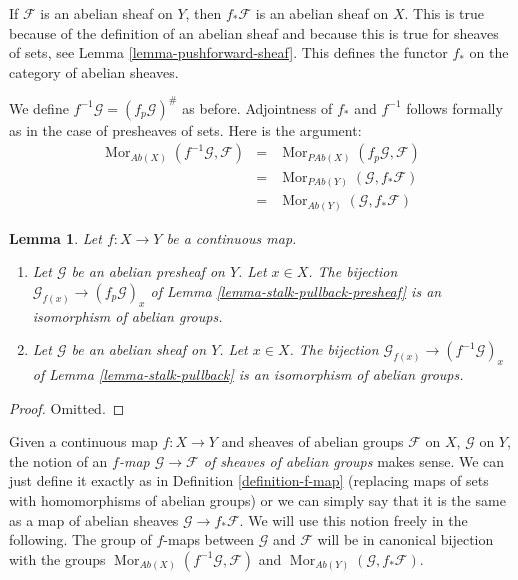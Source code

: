 \documentclass{stacks-project}
\theoremstyle{plain}
\newtheorem{lemma}[subsection]{Lemma}
\theoremstyle{definition}
\theoremstyle{remark}
\numberwithin{equation}{subsection}
\def\Mor{\mathop{\mathrm{Mor}}\nolimits}
\begin{document}
\medskip\noindent
If $\mathcal{F}$ is an abelian sheaf on $Y$, then $f_*\mathcal{F}$
is an abelian sheaf on $X$. This is true because of the definition
of an abelian sheaf and because this is true for sheaves of sets,
see Lemma \ref{lemma-pushforward-sheaf}. This defines the functor
$f_*$ on the category of abelian sheaves.

\medskip\noindent
We define $f^{-1}\mathcal{G} = (f_p\mathcal{G})^\#$ as before.
Adjointness of $f_*$ and $f^{-1}$ follows formally as in
the case of presheaves of sets. Here is the argument:
\begin{eqnarray*}
\Mor_{\textit{Ab}(X)}(f^{-1}\mathcal{G}, \mathcal{F})
& = &
\Mor_{\textit{PAb}(X)}(f_p\mathcal{G}, \mathcal{F}) \\
& = &
\Mor_{\textit{PAb}(Y)}(\mathcal{G}, f_*\mathcal{F}) \\
& = &
\Mor_{\textit{Ab}(Y)}(\mathcal{G}, f_*\mathcal{F})
\end{eqnarray*}

\begin{lemma}
\label{lemma-pullback-abelian-stalk}
Let $f : X \to Y$ be a continuous map.
\begin{enumerate}
\item Let $\mathcal{G}$ be an abelian presheaf on $Y$.
Let $x \in X$. The bijection
$\mathcal{G}_{f(x)} \to (f_p\mathcal{G})_x$ of
Lemma \ref{lemma-stalk-pullback-presheaf} is an isomorphism of abelian groups.
\item Let $\mathcal{G}$ be an abelian sheaf on $Y$.
Let $x \in X$. The bijection
$\mathcal{G}_{f(x)} \to (f^{-1}\mathcal{G})_x$ of
Lemma \ref{lemma-stalk-pullback} is an isomorphism of abelian groups.
\end{enumerate}
\end{lemma}

\begin{proof}
Omitted.
\end{proof}

\noindent
Given a continuous map $f : X \to Y$ and sheaves of abelian
groups $\mathcal{F}$ on $X$, $\mathcal{G}$ on $Y$, the notion
of an {\it $f$-map $\mathcal{G} \to \mathcal{F}$
of sheaves of abelian groups} makes sense. We can just define
it exactly as in Definition \ref{definition-f-map} (replacing maps
of sets with homomorphisms of abelian groups) or we can
simply say that it is the same as a map of abelian
sheaves $\mathcal{G} \to f_*\mathcal{F}$. We will use this
notion freely in the following. The group of $f$-maps between
$\mathcal{G}$ and $\mathcal{F}$ will be in canonical bijection
with the groups
$\Mor_{\textit{Ab}(X)}(f^{-1}\mathcal{G}, \mathcal{F})$
and
$\Mor_{\textit{Ab}(Y)}(\mathcal{G}, f_*\mathcal{F})$.
\end{document}
